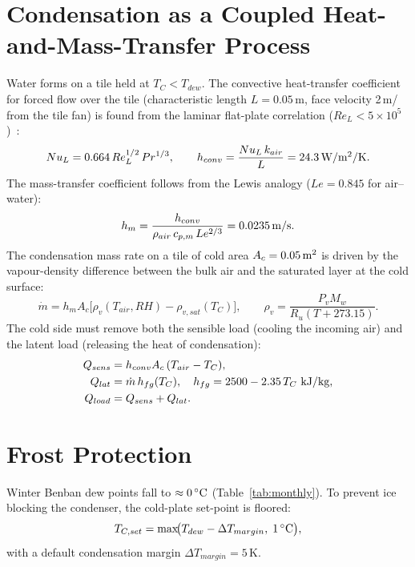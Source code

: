 \documentclass[12pt,a4paper]{report}
\newcommand{\si}[1]{\mbox{#1}}
\newcommand{\SI}[2]{#1\,\mbox{#2}}
\newcommand{\per}{/}
\newcommand{\meter}{m}\newcommand{\metre}{m}
\newcommand{\kilo}{k}\newcommand{\centi}{c}\newcommand{\milli}{m}
\newcommand{\kelvin}{K}
\newcommand{\degreeCelsius}{\ensuremath{^{\circ}}C}
\newcommand{\watt}{W}\newcommand{\Wh}{Wh}\newcommand{\kWh}{kWh}
\newcommand{\joule}{J}\newcommand{\pascal}{Pa}\newcommand{\newton}{N}
\newcommand{\sqm}{m\ensuremath{^{2}}}
\begin{document}
\section{Condensation as a Coupled Heat-and-Mass-Transfer Process}
Water forms on a tile held at $T_C<T_{dew}$. The convective heat-transfer
coefficient for forced flow over the tile (characteristic length
$L=\SI{0.05}{\meter}$, face velocity \SI{2}{\meter\per\second} from the tile fan)
is found from the laminar flat-plate correlation
($Re_L<5\times10^{5}$)~\cite{zhao2022teccondenser}:
\begin{equation}
  Nu_L=0.664\,Re_L^{1/2}\,Pr^{1/3},\qquad
  h_{conv}=\frac{Nu_L\,k_{air}}{L}=\SI{24.3}{\watt\per\sqm\per\kelvin}.
  \label{eq:nu}
\end{equation}
The mass-transfer coefficient follows from the Lewis analogy ($Le=0.845$ for
air--water):
\begin{equation}
  h_m=\frac{h_{conv}}{\rho_{air}\,c_{p,m}\,Le^{2/3}}=\SI{0.0235}{\meter\per\second}.
  \label{eq:hm}
\end{equation}
The condensation mass rate on a tile of cold area $A_{c}=\SI{0.05}{\sqm}$
is driven by the vapour-density difference between the bulk air and the saturated
layer at the cold surface:
\begin{equation}
  \dot{m}=h_m A_{c}\bigl[\rho_{v}(T_{air},RH)-\rho_{v,sat}(T_C)\bigr],\qquad
  \rho_{v}=\frac{P_v M_w}{R_u (T+273.15)}.
  \label{eq:mdot}
\end{equation}
The cold side must remove both the sensible load (cooling the incoming air) and
the latent load (releasing the heat of condensation):
\begin{align}
  Q_{sens}&=h_{conv}A_{c}\,(T_{air}-T_C),\label{eq:qsens}\\
  Q_{lat} &=\dot{m}\,h_{fg}(T_C),\quad h_{fg}=2500-2.35\,T_C\ \si{\kilo\joule\per\kg},\label{eq:qlat}\\
  Q_{load}&=Q_{sens}+Q_{lat}.\label{eq:qload}
\end{align}

\section{Frost Protection}
Winter Benban dew points fall to $\approx\SI{0}{\degreeCelsius}$
(Table~\ref{tab:monthly}). To prevent ice blocking the condenser, the cold-plate
set-point is floored:
\begin{equation}
  T_{C,set}=\max\!\bigl(T_{dew}-\Delta T_{margin},\;\SI{1}{\degreeCelsius}\bigr),
  \label{eq:frost}
\end{equation}
with a default condensation margin $\Delta T_{margin}=\SI{5}{\kelvin}$.
\end{document}
